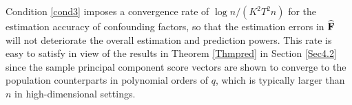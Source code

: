 \documentclass{statsoc}
\newtheorem{condition}{Condition}%
\newcommand{\bF}{\mbox{\bf F}}
\newcommand{\bZ}{\mbox{\bf Z}}
\newcommand{\bzero}{\mbox{\bf 0}}
\newcommand{\bveps}{\mbox{\boldmath $\varepsilon$}}
\def\t{^T}
\begin{document}






Condition \ref{cond3} imposes a convergence rate of $\log n/(K^2 T^2 n)$ for the estimation accuracy of confounding factors, so that the estimation errors in $\widehat{\bF}$ will not deteriorate the overall estimation and prediction powers. This rate is easy to satisfy in view of the results in Theorem \ref{Thmpred} in Section \ref{Sec4.2} since the sample principal component score vectors are shown to converge to the population counterparts in polynomial orders of $q$, which is typically larger than $n$ in high-dimensional settings.
\end{document}
